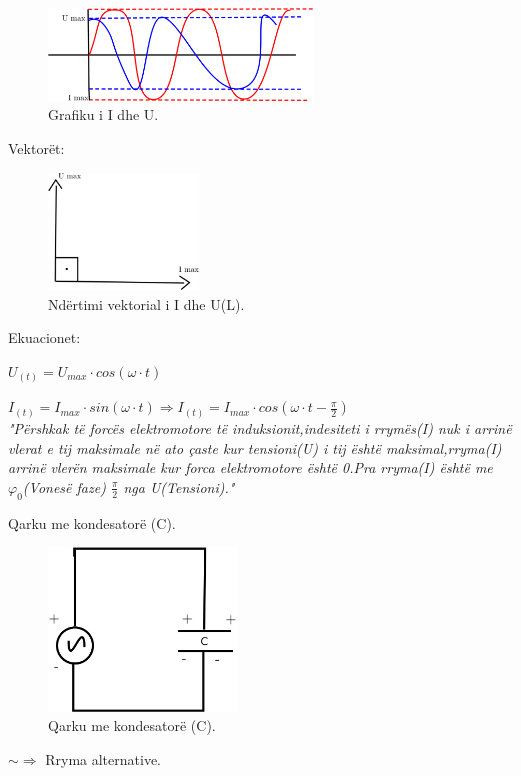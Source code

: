\documentclass[twocolumn]{article}
\begin{document}
	\begin{figure}[h]
		\includegraphics[width=70mm]{Imazhet/Grafik L.png}
		\caption{Grafiku i I  dhe U.}
		\label{fig:boat1}
	\end{figure}
	\begin{center}
		Vektorët:
	\end{center}
	\begin{figure}[h]
		\includegraphics[width=40mm]{Imazhet/Vektor L.png}
		\caption{Ndërtimi vektorial i I  dhe U(L).}
		\label{fig:boat1}
	\end{figure}
	
	\begin{center}
		Ekuacionet:
	\end{center}
	
	$U_{(t)}= U_{max} \cdot cos (\omega\cdot t)$
	
	
	$I_{(t)}= I_{max} \cdot sin (\omega\cdot t) \Rightarrow I_{(t)}= I_{max} \cdot cos(\omega \cdot t - \frac{\pi}{2})$\\
	
	
	
	
	\textit{"Përshkak të forcës elektromotore të induksionit,indesiteti i rrymës(I) nuk i arrinë vlerat e tij maksimale në ato çaste kur tensioni(U) i tij është maksimal,rryma(I) arrinë vlerën maksimale kur forca elektromotore është 0.Pra rryma(I) është me $\varphi_0$(Vonesë  faze) $\frac{\pi}{2}$ nga U(Tensioni)."}\\
	
	
	
	\begin{center}
		Qarku me kondesatorë (C).
	\end{center}
	
	\begin{figure}[h]
		\includegraphics[width=50mm]{Imazhet/Qarku C.jpg}
		\caption{Qarku me kondesatorë (C).}
		\label{fig:boat1}
	\end{figure}
	$ \sim \Rightarrow $ Rryma alternative.
	
\end{document}
